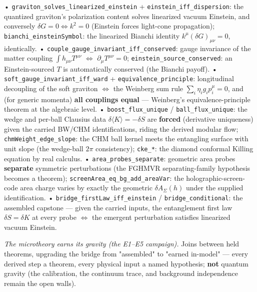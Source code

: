 \documentclass[11pt,a4paper]{article}
\begin{document}
  • \texttt{graviton\_solves\_linearized\_einstein} + \texttt{einstein\_iff\_dispersion}: the quantized graviton's polarization content solves linearized vacuum Einstein, and conversely $\delta G=0\Leftrightarrow k^2=0$ (Einstein forces light-cone propagation); \texttt{bianchi\_einsteinSymbol}: the linearized Bianchi identity $k^\mu(\delta G)_{\mu\nu}=0$, identically.
  • \texttt{couple\_gauge\_invariant\_iff\_conserved}: gauge invariance of the matter coupling $\int h_{\mu\nu}T^{\mu\nu}$ $\Leftrightarrow$ $\partial_\mu T^{\mu\nu}=0$; \texttt{einstein\_source\_conserved}: an Einstein-sourced $T$ is automatically conserved (the Bianchi payoff).
  • \texttt{soft\_gauge\_invariant\_iff\_ward} + \texttt{equivalence\_principle}: longitudinal decoupling of the soft graviton $\Leftrightarrow$ the Weinberg sum rule $\sum_i\eta_ig_ip_i^\mu=0$, and (for generic momenta) \textbf{all couplings equal} — Weinberg's equivalence-principle theorem at the algebraic level.
  • \texttt{boost\_flux\_unique} / \texttt{ball\_flux\_unique}: the wedge and per-ball Clausius data $\delta\langle K\rangle=-\delta S$ are \textbf{forced} (derivative uniqueness) given the carried BW/CHM identifications, riding the derived modular flow; \texttt{chmWeight\_edge\_slope}: the CHM ball kernel meets the entangling surface with unit slope (the wedge-ball $2\pi$ consistency); \texttt{cke\_*}: the diamond conformal Killing equation by real calculus.
  • \texttt{area\_probes\_separate}: geometric area probes \textbf{separate} symmetric perturbations (the FGHMVR separating-family hypothesis becomes a theorem); \texttt{screenArea\_eq\_bg\_add\_areaVar}: the holographic-screen-code area charge varies by exactly the geometric $\delta A_\Sigma(h)$ under the supplied identification.
  • \texttt{bridge\_firstLaw\_iff\_einstein} / \texttt{bridge\_conditional}: the assembled capstone — given the carried inputs, the entanglement first law $\delta S=\delta K$ at every probe $\Leftrightarrow$ the emergent perturbation satisfies linearized vacuum Einstein.

\emph{The microtheory earns its gravity (the E1--E5 campaign).} Joins between held theorems, upgrading the bridge from "assembled" to "earned in-model" — every derived step a theorem, every physical input a named hypothesis; \textbf{not} quantum gravity (the calibration, the continuum trace, and background independence remain the open walls).
\end{document}
